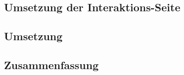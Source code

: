 \begin{spacing}{1}
	\chapter{Umsetzung der Interaktions-Seite}
	\end{spacing}
	
	

\begin{spacing}{1}
\chapter{Umsetzung}\label{chapter:implementation}
\end{spacing}


\begin{spacing}{1}
\chapter{Zusammenfassung}
\end{spacing}


\newpage
{}
\setcounter{page}{\value{RPages}}

\glsnogroupskiptrue
\printglossary[title=Glossar,toctitle=Glossar] %
\listoffigures
\listoftables
\lstlistoflistings
\appendix
{}



